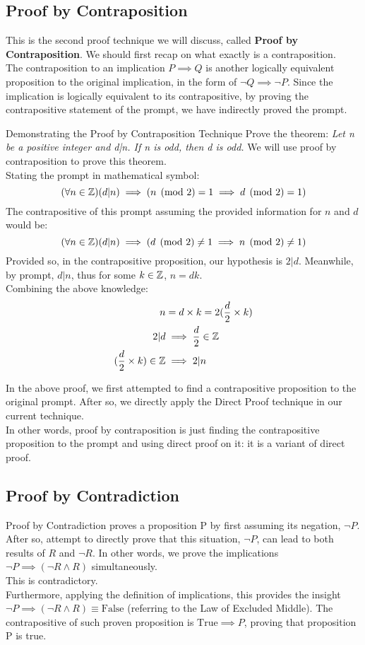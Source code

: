 \subsection{Proof by Contraposition}
This is the second proof technique we will discuss, called \textbf{Proof by Contraposition}. We should first recap on what exactly is a contraposition. \\
The contraposition to an implication $P \implies Q$ is another logically equivalent proposition to the original implication, in the form of $\neg Q \implies \neg P$. Since the implication is logically equivalent to its contrapositive, by proving the contrapositive statement of the prompt, we have indirectly proved the prompt. \\
\begin{ln-think}{Demonstrating the Proof by Contraposition Technique}{}
    Prove the theorem: \textit{Let n be a positive integer and d|n. If n is odd, then d is odd.}
    \tcblower
    We will use proof by contraposition to prove this theorem. \\
    Stating the prompt in mathematical symbol:
    \[(\forall n \in \mathbb{Z})(d|n) \implies (n\pmod{2} = 1 \implies d\pmod{2} = 1)\]
    The contrapositive of this prompt assuming the provided information for $n$ and $d$ would be:
    \[(\forall n \in \mathbb{Z})(d|n) \implies (d\pmod{2} \neq 1 \implies n\pmod{2} \neq 1)\]
    Provided so, in the contrapositive proposition, our hypothesis is $2|d$. Meanwhile, by prompt, $d|n$, thus for some $k \in \mathbb{Z}$, $n = dk$. \\
    Combining the above knowledge:
    \begin{align*}
        n &= d \times k = 2 (\frac{d}{2} \times k) \\
        2|d &\implies \frac{d}{2} \in \mathbb{Z}\\
        (\frac{d}{2} \times k) \in \mathbb{Z} &\implies 2|n
    \end{align*}
\end{ln-think}
In the above proof, we first attempted to find a contrapositive proposition to the original prompt. After so, we directly apply the Direct Proof technique in our current technique. \\
In other words, proof by contraposition is just finding the contrapositive proposition to the prompt and using direct proof on it: it is a variant of direct proof.

\subsection{Proof by Contradiction}
Proof by Contradiction proves a proposition P by first assuming its negation, $\neg P$. After so, attempt to directly prove that this situation, $\neg P$, can lead to both results of $R$ and $\neg R$. In other words, we prove the implications $\neg P \implies (\neg R \land R)$ simultaneously. \\
This is contradictory. \\
Furthermore, applying the definition of implications, this provides the insight $\neg P \implies (\neg R \land R) \equiv \text{False}$ (referring to the Law of Excluded Middle). The contrapositive of such proven proposition is $\text{True} \implies P$, proving that proposition P is true.

